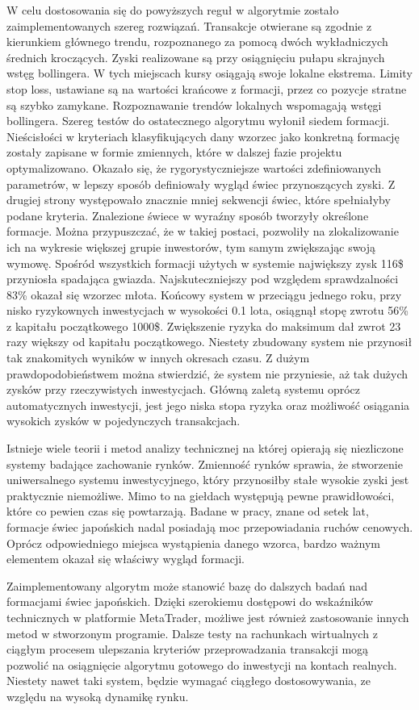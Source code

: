 \documentclass[pdflatex,11pt]{aghdpl}
\begin{document}
W celu dostosowania się do powyższych reguł w algorytmie zostało zaimplementowanych szereg rozwiązań. Transakcje otwierane są zgodnie z kierunkiem głównego trendu, rozpoznanego za pomocą dwóch wykładniczych średnich kroczących. Zyski realizowane są przy osiągnięciu pułapu skrajnych wstęg bollingera. W tych miejscach kursy osiągają swoje lokalne ekstrema. Limity stop loss, ustawiane są na wartości krańcowe z formacji, przez co pozycje stratne są szybko zamykane. Rozpoznawanie trendów lokalnych wspomagają wstęgi bollingera. Szereg testów do ostatecznego algorytmu wyłonił siedem formacji. Nieścisłości w kryteriach klasyfikujących dany wzorzec jako konkretną formację zostały zapisane w formie zmiennych, które w dalszej fazie projektu optymalizowano. Okazało się, że rygorystyczniejsze wartości zdefiniowanych parametrów, w lepszy sposób definiowały wygląd świec przynoszących zyski. Z drugiej strony występowało znacznie mniej sekwencji świec, które spełniałyby podane kryteria. Znalezione świece w wyraźny sposób tworzyły określone formacje. Można przypuszczać, że w takiej postaci, pozwoliły na zlokalizowanie ich na wykresie większej grupie inwestorów, tym samym zwiększając swoją wymowę. Spośród wszystkich formacji użytych w systemie największy zysk 116\$ przyniosła spadająca gwiazda. Najskuteczniejszy pod względem sprawdzalności 83\% okazał się wzorzec młota. Końcowy system w przeciągu jednego roku, przy nisko ryzykownych inwestycjach w wysokości 0.1 lota, osiągnął stopę zwrotu 56\% z kapitału początkowego 1000\$. Zwiększenie ryzyka do maksimum dał zwrot 23 razy większy od kapitału początkowego. Niestety zbudowany system nie przynosił tak znakomitych wyników w innych okresach czasu. Z dużym prawdopodobieństwem można stwierdzić, że system nie przyniesie, aż tak dużych zysków przy rzeczywistych inwestycjach. Główną zaletą systemu oprócz automatycznych inwestycji, jest jego niska stopa ryzyka oraz możliwość osiągania wysokich zysków w pojedynczych transakcjach. 

Istnieje wiele teorii i metod analizy technicznej na której opierają się niezliczone systemy badające zachowanie rynków. Zmienność rynków sprawia, że stworzenie uniwersalnego systemu inwestycyjnego, który przynosiłby stałe wysokie zyski jest praktycznie niemożliwe. Mimo to na giełdach występują pewne prawidłowości, które co pewien czas się powtarzają. Badane w pracy, znane od setek lat, formacje świec japońskich nadal posiadają moc przepowiadania ruchów cenowych. Oprócz odpowiedniego miejsca wystąpienia danego wzorca, bardzo ważnym elementem okazał się właściwy wygląd formacji. 

Zaimplementowany algorytm może stanowić bazę do dalszych badań nad formacjami świec japońskich. Dzięki szerokiemu dostępowi do wskaźników technicznych w platformie MetaTrader, możliwe jest również zastosowanie innych metod w stworzonym programie. Dalsze testy na rachunkach wirtualnych z ciągłym procesem ulepszania kryteriów przeprowadzania transakcji mogą pozwolić na osiągnięcie algorytmu gotowego do inwestycji na kontach realnych. Niestety nawet taki system, będzie wymagać ciągłego dostosowywania, ze względu na wysoką dynamikę rynku.
% 
% 



\end{document}
